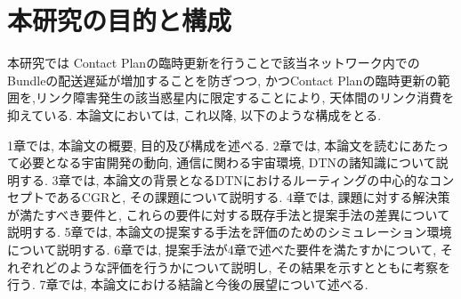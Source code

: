 \section{本研究の目的と構成}
本研究では
Contact Planの臨時更新を行うことで該当ネットワーク内でのBundleの配送遅延が増加することを防ぎつつ, 
かつContact Planの臨時更新の範囲を,リンク障害発生の該当惑星内に限定することにより, 
天体間のリンク消費を抑えている. 
本論文においては, これ以降, 以下のような構成をとる. 

1章では, 本論文の概要, 目的及び構成を述べる. 
2章では, 本論文を読むにあたって必要となる宇宙開発の動向, 通信に関わる宇宙環境, DTNの諸知識について説明する. 
3章では, 本論文の背景となるDTNにおけるルーティングの中心的なコンセプトであるCGRと, その課題について説明する.
4章では, 課題に対する解決策が満たすべき要件と, これらの要件に対する既存手法と提案手法の差異について説明する. 
5章では, 本論文の提案する手法を評価のためのシミュレーション環境について説明する. 
6章では, 提案手法が4章で述べた要件を満たすかについて, それぞれどのような評価を行うかについて説明し, その結果を示すとともに考察を行う. 
7章では, 本論文における結論と今後の展望について述べる.